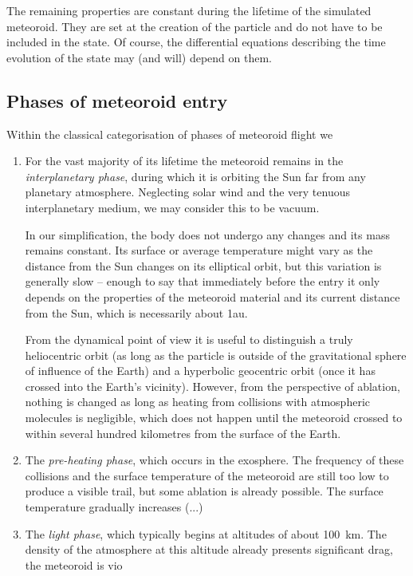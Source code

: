     The remaining properties are constant during the lifetime of the simulated meteoroid.
    They are set at the creation of the particle and do not have to be included in the state.
    Of course, the differential equations describing the time evolution of the state
    may (and will) depend on them.

    \subsection{Phases of meteoroid entry} \label{dap}
        Within the classical categorisation of phases of meteoroid flight \citep{???}
        we 

        \begin{enumerate}
            \item For the vast majority of its lifetime the meteoroid remains in
                the \emph{interplanetary phase}, during which it is orbiting the Sun
                far from any planetary atmosphere. Neglecting solar wind and
                the very tenuous interplanetary medium, we may consider this to be vacuum.

                In our simplification, the body does not undergo any changes and its mass remains constant.
                Its surface or average temperature might vary as the distance from
                the Sun changes on its elliptical orbit, but this variation
                is generally slow -- enough to say that immediately before the entry it only
                depends on the properties of the meteoroid material and its current distance from the Sun,
                which is necessarily about \si{1}{au}.

                From the dynamical point of view it is useful to distinguish a truly heliocentric orbit
                (as long as the particle is outside of the gravitational sphere of influence of the Earth)
                and a hyperbolic geocentric orbit (once it has crossed into the Earth's vicinity).
                However, from the perspective of ablation, nothing is changed
                as long as heating from collisions with atmospheric molecules is negligible,
                which does not happen until the meteoroid crossed to within several hundred
                kilometres from the surface of the Earth.
            \item The \emph{pre-heating phase}, which occurs in the exosphere. The frequency of these collisions
                and the surface temperature of the meteoroid are still too low to produce a visible
                trail, but some ablation is already possible. The surface temperature
                gradually increases (...)
            \item The \emph{light phase}, which typically begins at altitudes of about \SI{100}{\kilo\metre}.
                The density of the atmosphere at this altitude already presents significant drag,
                the meteoroid is vio


\end{enumerate}
